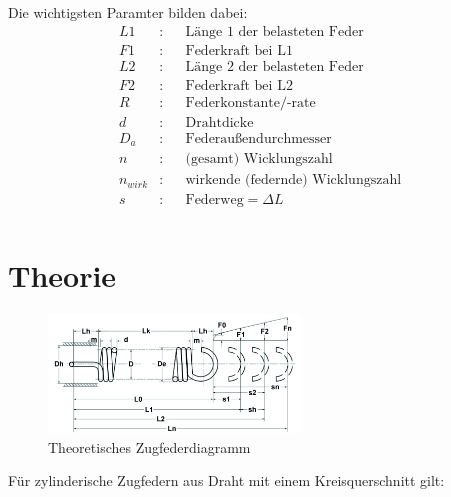     Die wichtigsten Paramter bilden dabei:
    \begin{align*}
        L1 &:& &\text{Länge 1 der belasteten Feder}\\
        F1 &:& &\text{Federkraft bei L1}\\
        L2 &:& &\text{Länge 2 der belasteten Feder}\\
        F2 &:& &\text{Federkraft bei L2}\\
        R &:& &\text{Federkonstante/-rate}\\
        d &:& &\text{Drahtdicke}\\
        D_a &:& &\text{Federaußendurchmesser}\\
        n &:& &\text{(gesamt) Wicklungszahl}\\
        n_{wirk}&:& &\text{wirkende (federnde) Wicklungszahl}\\
        s &:& &\text{Federweg}=\Delta L \\
    \end{align*}  























\newpage
\section{Theorie}
\begin{figure}[H]
    \centering
    \includegraphics[width=0.6\textwidth]{bilder/Input/Zugfeder_technisch.jpg}
    \caption{Theoretisches Zugfederdiagramm \cite{AusM2}}
\end{figure}
Für zylinderische Zugfedern aus Draht mit einem Kreisquerschnitt gilt:\\\\

